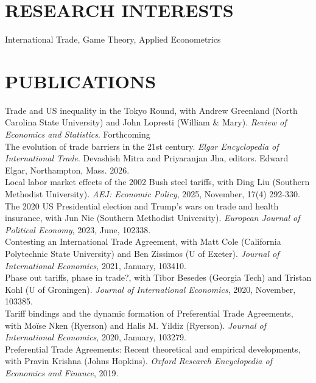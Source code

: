 \documentclass[11pt]{res}
\begin{document}
\begin{resume}
\section{RESEARCH INTERESTS}\vspace{1.5mm}
International Trade, Game Theory, Applied Econometrics

\section{PUBLICATIONS}\vspace{1.5mm}
{Trade and US inequality in the Tokyo Round}, with Andrew Greenland (North Carolina State University) and John Lopresti (William \& Mary). \emph{Review of Economics and Statistics}. Forthcoming \vspace{1.5mm}\\
{The evolution of trade barriers in the 21st century}. \emph{Elgar Encyclopedia of International Trade}. Devashish Mitra and Priyaranjan Jha, editors. Edward Elgar, Northampton, Mass. 2026.\vspace{1.5mm}\\
{Local labor market effects of the 2002 Bush steel tariffs}, with Ding Liu (Southern Methodist University). \emph{AEJ: Economic Policy}, 2025, November, 17(4) 292-330. \vspace{1.5mm}\\
{The 2020 US Presidential election and Trump's wars on trade and health insurance}, with Jun Nie (Southern Methodist University). \emph{European Journal of Political Economy}, 2023, June, 102338.\vspace{1.5mm}\\
{Contesting an International Trade Agreement}, with Matt Cole (California Polytechnic State University) and Ben Zissimos (U of Exeter). \emph{Journal of International Economics}, 2021, January, 103410.\vspace{1.5mm}\\
{Phase out tariffs, phase in trade?}, with Tibor Besedes (Georgia Tech) and Tristan Kohl (U of Groningen). \emph{Journal of International Economics}, 2020, November, 103385.\vspace{1.5mm}\\
{Tariff bindings and the dynamic formation of Preferential Trade Agreements}, with Mo\"ise Nken (Ryerson) and Halis M. Yildiz (Ryerson). \emph{Journal of International Economics}, 2020, January, 103279.\vspace{1.5mm}\\
{Preferential Trade Agreements: Recent theoretical and empirical developments}, with Pravin Krishna (Johns Hopkins). \emph{Oxford Research Encyclopedia of Economics and Finance}, 2019.\vspace{1.5mm}\\

\end{resume}
\end{document}
